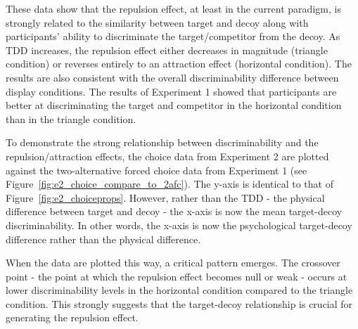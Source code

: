 These data show that the repulsion effect, at least in the current paradigm, is strongly related to the similarity between target and decoy along with participants' ability to discriminate the target/competitor from the decoy. As TDD increases, the repulsion effect either decreases in magnitude (triangle condition) or reverses entirely to an attraction effect (horizontal condition). The results are also consistent with the overall discriminability difference between display conditions. The results of Experiment 1 showed that participants are better at discriminating the target and competitor in the horizontal condition than in the triangle condition. 

To demonstrate the strong relationship between discriminability and the repulsion/attraction effects, the choice data from Experiment 2 are plotted against the two-alternative forced choice data from Experiment 1 (see Figure~\ref{fig:e2_choice_compare_to_2afc}). The y-axis is identical to that of Figure~\ref{fig:e2_choiceprops}. However, rather than the TDD - the physical difference between target and decoy - the x-axis is now the mean target-decoy discriminability. In other words, the x-axis is now the psychological target-decoy difference rather than the physical difference. 

When the data are plotted this way, a critical pattern emerges. The crossover point - the point at which the repulsion effect becomes null or weak - occurs at lower discriminability levels in the horizontal condition compared to the triangle condition. This strongly suggests that the target-decoy relationship is crucial for generating the repulsion effect.

